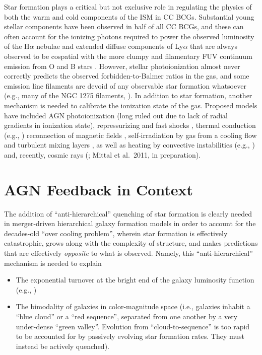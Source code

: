 Star formation plays a critical but not exclusive role in regulating the
physics of both the warm and cold components of the ISM in CC BCGs.
Substantial young stellar components have been observed in
half of all CC BCGs, and these can often account for 
the ionizing photons required to power the observed luminosity of the H$\alpha$ 
nebulae and extended diffuse components of Ly$\alpha$ that are always observed
to be cospatial with the more clumpy and filamentary FUV continuum emission from O and B stars \citep{johnstone87,romanishin87,  mcnamara89,  mcnamara93,mcnamara04,mcnamara04b,hu92,crawford93,hansen95,allen95,smith97, cardiel98,hutchings00,oegerle01,mittaz01,odea04,hicks05,odea08,bildfell08,loubser09,pipino09,odea10,mcdonald10,mcdonald11,oonk11}.
However, stellar photoionization almost never correctly predicts the observed 
forbidden-to-Balmer ratios in the gas, and some emission line filaments 
are devoid of any observable star formation whatsoever (e.g., many of the NGC 1275 filaments, \citealt{conselice01}). In addition to star formation, another 
mechanism is needed to calibrate the ionization state of the gas. 
Proposed models have included AGN photoionization (long ruled out due to lack of radial gradients in ionization state), repressurizing and fast shocks \citep{cowie80,binette85,david88}, 
thermal conduction (e.g.,
\citealt{sparks89,narayan01,fabian02,voit08})  reconnection of  magnetic fields
\citep{soker90}, self-irradiation by gas from a cooling flow
\citep{voit90,donahue91} and turbulent mixing layers \citep{begelman90}, as
well as heating by convective instabilities (e.g., \citealt{chandran07}) and,
recently, cosmic rays (\citealt{ferland08,ferland09,donahue11,fabian11}; Mittal et al.~2011, in preparation). 












\section{AGN Feedback in Context}


The addition of ``anti-hierarchical'' quenching of star formation is clearly needed in
merger-driven hierarchical galaxy formation models in order to account for the decades-old ``over cooling problem'', wherein 
star formation is effectively catastrophic, grows along with the complexity of structure, and makes 
predictions that are effectively {\it opposite} to what is observed. Namely, this ``anti-hierarchical'' mechanism 
is needed to explain 
\begin{itemize}
\item The exponential turnover at the bright end of the galaxy luminosity function (e.g., \citealt{benson03})
\item The bimodality of galaxies in color-magnitude space (i.e., galaxies inhabit a ``blue cloud'' or a ``red sequence'', 
separated from one another by a very under-dense ``green valley''. Evolution from ``cloud-to-sequence'' is too rapid 
to be accounted for by passively evolving star formation rates. They must instead be actively quenched). 
\end{itemize}

